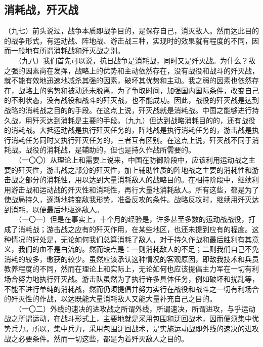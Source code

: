 \documentclass[cn,11pt,chinese]{elegantbook}
\def\myformat#1{\hfil\hfil #1}
\begin{document}
\subsection*{\myformat{消耗战，歼灭战}}
（九七）前头说过，战争本质即战争目的，是保存自己，消灭敌人。然而达此目的的战争形式，有运动战、阵地战、游击战三种，实现时的效果就有程度的不同，因而一般地有所谓消耗战和歼灭战之别。\\
　　（九八）我们首先可以说，抗日战争是消耗战，同时又是歼灭战。为什么？敌之强的因素尚在发挥，战略上的优势和主动依然存在，没有战役和战斗的歼灭战，就不能有效地迅速地减杀其强的因素，破坏其优势和主动。我之弱的因素也依然存在，战略上的劣势和被动还未脱离，为了争取时间，加强国内国际条件，改变自己的不利状态，没有战役和战斗的歼灭战，也不能成功。因此，战役的歼灭战是达到战略的消耗战之目的的手段。在这点上说，歼灭战就是消耗战。中国之能够进行持久战，用歼灭达到消耗是主要的手段。（九九）但达到战略消耗目的的，还有战役的消耗战。大抵运动战是执行歼灭任务的，阵地战是执行消耗任务的，游击战是执行消耗任务同时又执行歼灭任务的，三者互有区别。在这点上说，歼灭战不同于消耗战。战役的消耗战，是辅助的，但也是持久作战所需要的。\\
　　（一〇〇）从理论上和需要上说来，中国在防御阶段中，应该利用运动战之主要的歼灭性，游击战之部分的歼灭性，加上辅助性质的阵地战之主要的消耗性和游击战之部分的消耗性，用以达到大量消耗敌人的战略目的。在相持阶段中，继续利用游击战和运动战的歼灭性和消耗性，再行大量地消耗敌人。所有这些，都是为了使战局持久，逐渐地转变敌我形势，准备反攻的条件。战略反攻时，继续用歼灭达到消耗，以便最后地驱逐敌人。\\
　　（一〇一）但是在事实上，十个月的经验是，许多甚至多数的运动战战役，打成了消耗战；游击战之应有的歼灭作用，在某些地区，也还未提到应有的程度。这种情况的好处是，无论如何我们总算消耗了敌人，对于持久作战和最后胜利有其意义，我们的血不是白流的。然而缺点是：一则消耗敌人的不足；二则我们自己不免消耗的较多，缴获的较少。虽然应该承认这种情况的客观原因，即敌我技术和兵员教养程度的不同，然而在理论上和实际上，无论如何也应该提倡主力军在一切有利场合努力地执行歼灭战。游击队虽然为了执行许多具体任务，例如破坏和扰乱等，不能不进行单纯的消耗战，然而仍须提倡并努力实行在战役和战斗之一切有利场合的歼灭性的作战，以达既能大量消耗敌人又能大量补充自己之目的。\\
　　（一〇二）外线的速决的进攻战之所谓外线，所谓速决，所谓进攻，与乎运动战之所谓运动，在战斗形式上，主要地就是采用包围和迂回战术，因而便须集中优势兵力。所以，集中兵力，采用包围迂回战术，是实施运动战即外线的速决的进攻战之必要条件。然而一切这些，都是为着歼灭敌人之目的。\\
\end{document}
